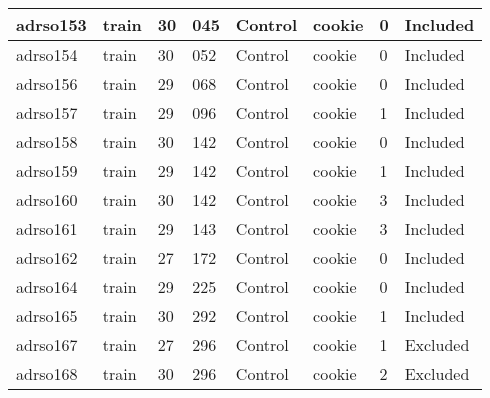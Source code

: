 \begin{center}
\begin{longtable}{|l|l|l|l|l|l|l|l|}
adrso153       & train                 & 30              & 045                & Control              & cookie          & 0                & Included      \\ \hline
adrso154       & train                 & 30              & 052                & Control              & cookie          & 0                & Included      \\ \hline
adrso156       & train                 & 29              & 068                & Control              & cookie          & 0                & Included      \\ \hline
adrso157       & train                 & 29              & 096                & Control              & cookie          & 1                & Included      \\ \hline
adrso158       & train                 & 30              & 142                & Control              & cookie          & 0                & Included      \\ \hline
adrso159       & train                 & 29              & 142                & Control              & cookie          & 1                & Included      \\ \hline
adrso160       & train                 & 30              & 142                & Control              & cookie          & 3                & Included      \\ \hline
adrso161       & train                 & 29              & 143                & Control              & cookie          & 3                & Included      \\ \hline
adrso162       & train                 & 27              & 172                & Control              & cookie          & 0                & Included      \\ \hline
adrso164       & train                 & 29              & 225                & Control              & cookie          & 0                & Included      \\ \hline
adrso165       & train                 & 30              & 292                & Control              & cookie          & 1                & Included      \\ \hline
adrso167       & train                 & 27              & 296                & Control              & cookie          & 1                & Excluded      \\ \hline
adrso168       & train                 & 30              & 296                & Control              & cookie          & 2                & Excluded      \\ \hline

\end{longtable}
\end{center}
